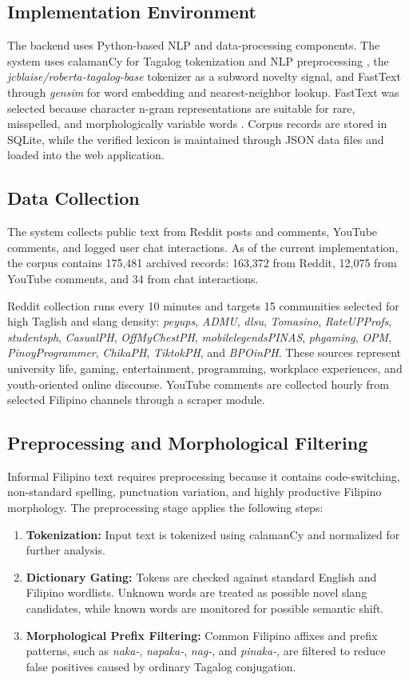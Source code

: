 \subsection{Implementation Environment}
The backend uses Python-based NLP and data-processing components. The system uses calamanCy for Tagalog tokenization and NLP preprocessing \cite{b6}, the \textit{jcblaise/roberta-tagalog-base} tokenizer as a subword novelty signal, and FastText through \textit{gensim} for word embedding and nearest-neighbor lookup. FastText was selected because character n-gram representations are suitable for rare, misspelled, and morphologically variable words \cite{b5}. Corpus records are stored in SQLite, while the verified lexicon is maintained through JSON data files and loaded into the web application.

\subsection{Data Collection}
The system collects public text from Reddit posts and comments, YouTube comments, and logged user chat interactions. As of the current implementation, the corpus contains 175,481 archived records: 163,372 from Reddit, 12,075 from YouTube comments, and 34 from chat interactions.

Reddit collection runs every 10 minutes and targets 15 communities selected for high Taglish and slang density: \textit{peyups}, \textit{ADMU}, \textit{dlsu}, \textit{Tomasino}, \textit{RateUPProfs}, \textit{studentsph}, \textit{CasualPH}, \textit{OffMyChestPH}, \textit{mobilelegendsPINAS}, \textit{phgaming}, \textit{OPM}, \textit{PinoyProgrammer}, \textit{ChikaPH}, \textit{TiktokPH}, and \textit{BPOinPH}. These sources represent university life, gaming, entertainment, programming, workplace experiences, and youth-oriented online discourse. YouTube comments are collected hourly from selected Filipino channels through a scraper module.

\subsection{Preprocessing and Morphological Filtering}
Informal Filipino text requires preprocessing because it contains code-switching, non-standard spelling, punctuation variation, and highly productive Filipino morphology. The preprocessing stage applies the following steps:

\begin{enumerate}
    \item \textbf{Tokenization:} Input text is tokenized using calamanCy and normalized for further analysis.
    \item \textbf{Dictionary Gating:} Tokens are checked against standard English and Filipino wordlists. Unknown words are treated as possible novel slang candidates, while known words are monitored for possible semantic shift.
    \item \textbf{Morphological Prefix Filtering:} Common Filipino affixes and prefix patterns, such as \textit{naka-}, \textit{napaka-}, \textit{nag-}, and \textit{pinaka-}, are filtered to reduce false positives caused by ordinary Tagalog conjugation.
\end{enumerate}

